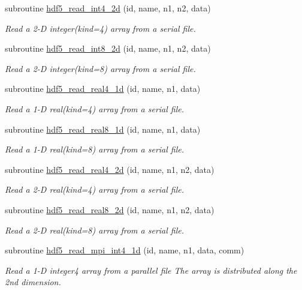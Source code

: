 \begin{DoxyCompactItemize}
subroutine \hyperlink{classmodhdf5_a29f383042b1dc2b1fc1155af48fc98a3}{hdf5\-\_\-read\-\_\-int4\-\_\-2d} (id, name, n1, n2, data)
\begin{DoxyCompactList}\small\item\em Read a 2-\/\-D integer(kind=4) array from a serial file. \end{DoxyCompactList}\item 
subroutine \hyperlink{classmodhdf5_a4ac00fa4fbae4c8a8f936ee48292e114}{hdf5\-\_\-read\-\_\-int8\-\_\-2d} (id, name, n1, n2, data)
\begin{DoxyCompactList}\small\item\em Read a 2-\/\-D integer(kind=8) array from a serial file. \end{DoxyCompactList}\item 
subroutine \hyperlink{classmodhdf5_ae087ad5b47b31640a477e5056aaf97e9}{hdf5\-\_\-read\-\_\-real4\-\_\-1d} (id, name, n1, data)
\begin{DoxyCompactList}\small\item\em Read a 1-\/\-D real(kind=4) array from a serial file. \end{DoxyCompactList}\item 
subroutine \hyperlink{classmodhdf5_a584fb8f065f2c6675049794e856b5085}{hdf5\-\_\-read\-\_\-real8\-\_\-1d} (id, name, n1, data)
\begin{DoxyCompactList}\small\item\em Read a 1-\/\-D real(kind=8) array from a serial file. \end{DoxyCompactList}\item 
subroutine \hyperlink{classmodhdf5_a36acd2df481965d7cb9c1b312fdff7b0}{hdf5\-\_\-read\-\_\-real4\-\_\-2d} (id, name, n1, n2, data)
\begin{DoxyCompactList}\small\item\em Read a 2-\/\-D real(kind=4) array from a serial file. \end{DoxyCompactList}\item 
subroutine \hyperlink{classmodhdf5_a7ba4b99f85945770344cdd73b713ea3a}{hdf5\-\_\-read\-\_\-real8\-\_\-2d} (id, name, n1, n2, data)
\begin{DoxyCompactList}\small\item\em Read a 2-\/\-D real(kind=8) array from a serial file. \end{DoxyCompactList}\item 
subroutine \hyperlink{classmodhdf5_a18b987f7a44198ccc7dd893cbdc322fc}{hdf5\-\_\-read\-\_\-mpi\-\_\-int4\-\_\-1d} (id, name, n1, data, comm)
\begin{DoxyCompactList}\small\item\em Read a 1-\/\-D integer4 array from a parallel file The array is distributed along the 2nd dimension. \end{DoxyCompactList}\item 

\end{DoxyCompactItemize}
